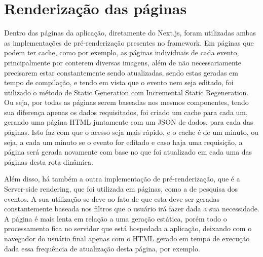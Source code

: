 \section{Renderização das páginas}
Dentro das páginas da aplicação, diretamente do Next.js, foram utilizadas ambas as implementações de pré-renderização presentes no framework. Em páginas que podem ter cache, como por exemplo, as páginas individuais de cada evento, principalmente por conterem diversas imagens, além de não necessariamente precisarem estar constantemente sendo atualizadas, sendo estas geradas em tempo de compilação, e tendo em vista que o evento nem seja editado, foi utilizado o método de Static Generation com Incremental Static Regeneration. Ou seja, por todas as páginas serem baseadas nos mesmos componentes, tendo sua diferença apenas os dados requisitados, foi criado um cache para cada um, gerando uma página HTML juntamente com um JSON de dados, para cada das páginas. Isto faz com que o acesso seja mais rápido, e o cache é de um minuto, ou seja, a cada um minuto se o evento for editado e caso haja uma requisição, a página será gerada novamente com base no que foi atualizado em cada uma das páginas desta rota dinâmica.

Além disso, há também a outra implementação de pré-renderização, que é a Server-side rendering, que foi utilizada em páginas, como a de pesquisa dos eventos. A sua utilização se deve ao fato de que esta deve ser geradas constantemente baseada nos filtros que o usuário irá fazer dada a sua necessidade. A página é mais lenta em relação a uma geração estática, porém todo o processamento fica no servidor que está hospedada a aplicação, deixando com o navegador do usuário final apenas com o HTML gerado em tempo de execução dada essa frequência de atualização desta página, por exemplo.
